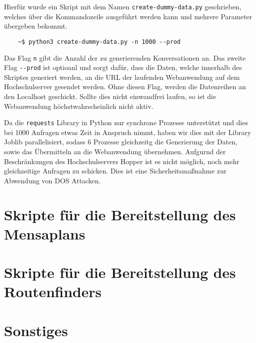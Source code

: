 Hierfür wurde ein Skript mit dem Namen \verb|create-dummy-data.py| geschrieben, welches über die Kommandozeile ausgeführt werden kann
und mehrere Parameter übergeben bekommt.

\begin{lstlisting}
    ~$ python3 create-dummy-data.py -n 1000 --prod
\end{lstlisting}

Das Flag \verb|n| gibt die Anzahl der zu generierenden Konversationen an. Das zweite Flag \verb|--prod| ist optioanl und
sorgt dafür, dass die Daten, welche innerhalb des Skriptes generiert werden, an die URL der
laufenden Webanwendung auf dem Hochschulserver gesendet werden. Ohne diesen Flag, werden die Datenreihen an den Localhost geschickt.
Sollte dies nicht einwandfrei laufen, so ist die Webanwendung höchstwahrscheinlich nicht aktiv.

Da die \verb|requests| Library in Python nur synchrone Prozesse unterstützt und dies bei 1000 Anfragen etwas Zeit in Anspruch nimmt,
haben wir dies mit der Library Joblib parallelisiert, sodass 6 Prozesse gleichzeitg die Generierung der Daten, sowie das Übermitteln
an die Webanwendung übernehmen. Aufgurnd der Beschränkungen des Hochschulservers Hopper ist es nicht möglich, noch mehr
gleichzeitige Anfragen zu schicken. Dies ist eine Sicherheitsmaßnahme zur Abwendung von DOS Attacken.


\section{Skripte für die Bereitstellung des Mensaplans}

\section{Skripte für die Bereitstellung des Routenfinders}

\section{Sonstiges}
